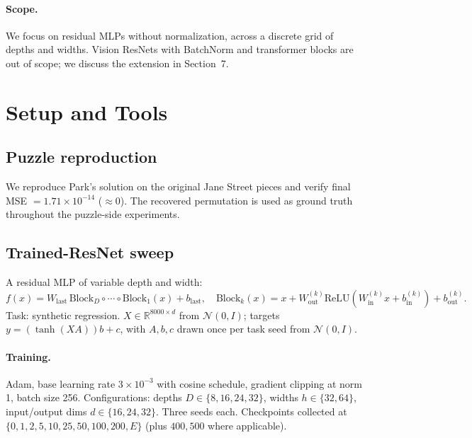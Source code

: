 \documentclass[10pt]{article}
\theoremstyle{remark}
\begin{document}
\paragraph{Scope.} We focus on residual MLPs without normalization,
across a discrete grid of depths and widths. Vision ResNets with
BatchNorm and transformer blocks are out of scope; we discuss the
extension in Section~7.

\section{Setup and Tools}

\subsection{Puzzle reproduction}

We reproduce Park's solution on the original Jane Street pieces and
verify final MSE $=1.71\times 10^{-14}$ ($\approx 0$). The recovered
permutation is used as ground truth throughout the puzzle-side
experiments.

\subsection{Trained-ResNet sweep}

A residual MLP of variable depth and width:
\[
  f(x) = W_{\mathrm{last}}\, \mathrm{Block}_D \circ \cdots \circ \mathrm{Block}_1(x) + b_{\mathrm{last}},
  \quad
  \mathrm{Block}_k(x) = x + W_{\mathrm{out}}^{(k)} \mathrm{ReLU}(W_{\mathrm{in}}^{(k)} x + b_{\mathrm{in}}^{(k)}) + b_{\mathrm{out}}^{(k)}.
\]
Task: synthetic regression. $X \in \mathbb{R}^{8000 \times d}$ from
$\mathcal{N}(0,I)$; targets $y = (\tanh(XA))b + c$, with $A,b,c$ drawn
once per task seed from $\mathcal{N}(0,I)$.

\paragraph{Training.} Adam, base learning rate $3{\times}10^{-3}$ with
cosine schedule, gradient clipping at norm 1, batch size 256.
Configurations: depths $D\in\{8, 16, 24, 32\}$, widths $h\in\{32, 64\}$,
input/output dims $d\in\{16, 24, 32\}$. Three seeds each. Checkpoints
collected at $\{0, 1, 2, 5, 10, 25, 50, 100, 200, E\}$ (plus $400, 500$
where applicable).
\end{document}
